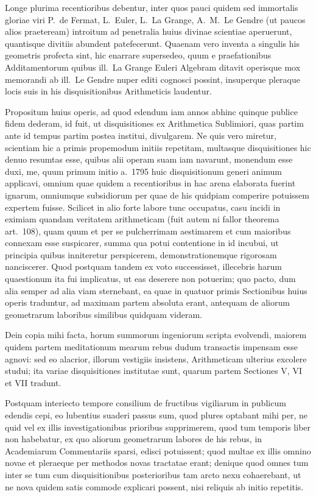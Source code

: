 \documentclass[12pt,a4paper]{article}
\theoremstyle{plain}
\theoremstyle{definition}
\theoremstyle{remark}
\begin{document}
Longe plurima recentioribus debentur, inter quos pauci quidem sed immortalis gloriae viri P.~de Fermat, L.~Euler, L.~La Grange, A.~M.~Le Gendre (ut paucos alios praeteream) introitum ad penetralia huius divinae scientiae aperuerunt, quantisque divitiis abundent patefecerunt. Quaenam vero inventa a singulis his geometris profecta sint, hic enarrare supersedeo, quum e praefationibus Additamentorum quibus ill.~La Grange Euleri Algebram ditavit operisque mox memorandi ab ill.~Le Gendre nuper editi cognosci possint, insuperque pleraque locis suis in his disquisitionibus Arithmeticis laudentur.

Propositum huius operis, ad quod edendum iam annos abhinc quinque publice fidem dederam, id fuit, ut disquisitiones ex Arithmetica Sublimiori, quas partim ante id tempus partim postea institui, divulgarem. Ne quis vero miretur, scientiam hic a primis propemodum initiis repetitam, multasque disquisitiones hic denuo resumtas esse, quibus alii operam suam iam navarunt, monendum esse duxi, me, quum primum initio a.~1795 huic disquisitionum generi animum applicavi, omnium quae quidem a recentioribus in hac arena elaborata fuerint ignarum, omniumque subsidiorum per quae de his quidpiam comperire potuissem expertem fuisse. Scilicet in alio forte labore tunc occupatus, casu incidi in eximiam quandam veritatem arithmeticam (fuit autem ni fallor theorema art.~108), quam quum et per se pulcherrimam aestimarem et cum maioribus connexam esse suspicarer, summa qua potui contentione in id incubui, ut principia quibus inniteretur perspicerem, demonstrationemque rigorosam nanciscerer. Quod postquam tandem ex voto successisset, illecebris harum quaestionum ita fui implicatus, ut eas deserere non potuerim; quo pacto, dum alia semper ad alia viam sternebant, ea quae in quatuor primis Sectionibus huius operis traduntur, ad maximam partem absoluta erant, antequam de aliorum geometrarum laboribus similibus quidquam videram.

Dein copia mihi facta, horum summorum ingeniorum scripta evolvendi, maiorem quidem partem meditationum mearum rebus dudum transactis impensam esse agnovi: sed eo alacrior, illorum vestigiis insistens, Arithmeticam ulterius excolere studui; ita variae disquisitiones institutae sunt, quarum partem Sectiones V, VI et VII tradunt.

Postquam interiecto tempore consilium de fructibus vigiliarum in publicum edendis cepi, eo lubentius suaderi passus sum, quod plures optabant mihi per, ne quid vel ex illis investigationibus prioribus supprimerem, quod tum temporis liber non habebatur, ex quo aliorum geometrarum labores de his rebus, in Academiarum Commentariis sparsi, edisci potuissent; quod multae ex illis omnino novae et pleraeque per methodos novas tractatae erant; denique quod omnes tum inter se tum cum disquisitionibus posterioribus tam arcto nexu cohaerebant, ut ne nova quidem satis commode explicari possent, nisi reliquis ab initio repetitis.
\end{document}
